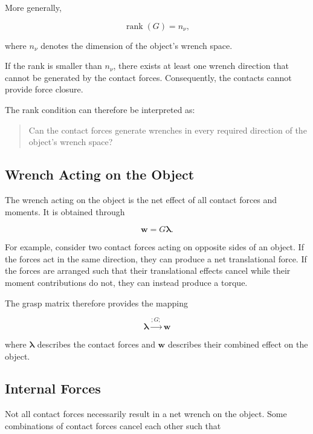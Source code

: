 More generally,

\begin{equation}
\operatorname{rank}(G) = n_{\nu},
\end{equation}

where $n_{\nu}$ denotes the dimension of the object's wrench space.

If the rank is smaller than $n_{\nu}$, there exists at least one wrench direction that cannot be generated by the contact forces. Consequently, the contacts cannot provide force closure.

The rank condition can therefore be interpreted as:

\begin{quote}
Can the contact forces generate wrenches in every required direction of the object's wrench space?
\end{quote}

\subsection{Wrench Acting on the Object}

The wrench acting on the object is the net effect of all contact forces and moments. It is obtained through

\begin{equation}
\mathbf{w} = G\boldsymbol{\lambda}.
\end{equation}

For example, consider two contact forces acting on opposite sides of an object. If the forces act in the same direction, they can produce a net translational force. If the forces are arranged such that their translational effects cancel while their moment contributions do not, they can instead produce a torque.

The grasp matrix therefore provides the mapping

\begin{equation}
\boxed{
\boldsymbol{\lambda}
\xrightarrow{;G;}
\mathbf{w}
}
\end{equation}

where $\boldsymbol{\lambda}$ describes the contact forces and $\mathbf{w}$ describes their combined effect on the object.

\subsection{Internal Forces}

Not all contact forces necessarily result in a net wrench on the object. Some combinations of contact forces cancel each other such that

